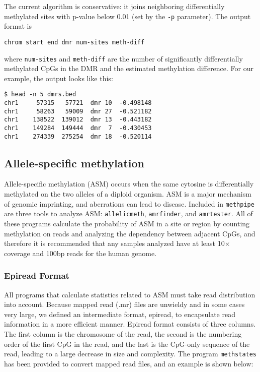 \documentclass[10pt]{article}
\newcommand{\prog}[1]{\texttt{#1}}
\begin{document}
The current algorithm is conservative: it joins neighboring differentially
methylated sites with p-value below 0.01 (set by the {\tt -p} parameter). 
The output format is
{\small{%
\begin{verbatim}
chrom start end dmr num-sites meth-diff
\end{verbatim}%
}}
\noindent where {\tt num-sites} and {\tt meth-diff} are the number of 
significantly differentially methylated CpGs in the DMR and the estimated 
methylation difference. For our example, the output looks like this:
{\small{%
\begin{verbatim}
$ head -n 5 dmrs.bed
chr1	 57315	 57721	dmr	10	-0.498148
chr1	 58263	 59009	dmr	27	-0.521182
chr1	138522	139012	dmr	13	-0.443182
chr1	149284	149444	dmr	 7	-0.430453
chr1	274339	275254	dmr	18	-0.520114
\end{verbatim}%

\subsection{Allele-specific methylation}

Allele-specific methylation (ASM) occurs when the same cytosine is
differentially methylated on the two alleles of a diploid organism.
ASM is a major mechanism of genomic imprinting, and aberrations can
lead to disease. Included in \prog{methpipe} are three tools to
analyze ASM: \prog{allelicmeth}, \prog{amrfinder}, and \prog{amrtester}.
All of these programs calculate the probability of ASM in a site or
region by counting methylation on reads and analyzing the dependency
between adjacent CpGs, and therefore it is recommended that any samples
analyzed have at least 10$\times$ coverage and 100bp reads for the human
genome.

\subsubsection{Epiread Format}

All programs that calculate statistics related to ASM must take read
distribution into account. Because mapped read (.mr) files are unwieldy
and in some cases very large, we defined an intermediate format, epiread,
to encapsulate read information in a more efficient manner. Epiread format
consists of three columns. The first column is the chromosome of the read,
the second is the numbering order of the first CpG in the read, and the
last is the CpG-only sequence of the read, leading to a large decrease in
size and complexity. The program \prog{methstates} has been provided to
convert mapped read files, and an example is shown below:

}}
\end{document}
